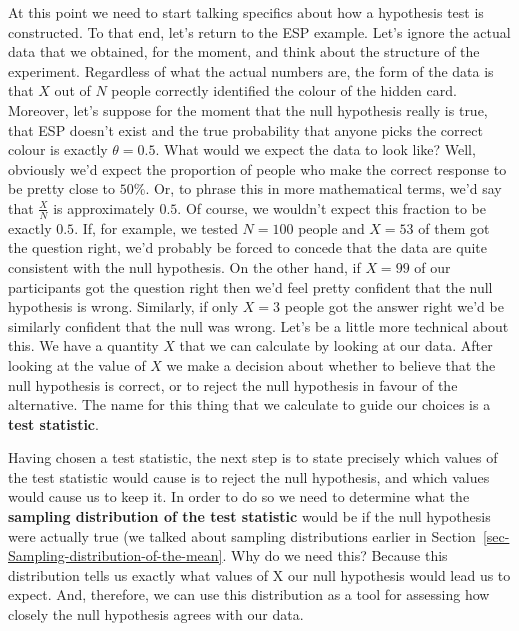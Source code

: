 \documentclass[
  a4paper,
]{book}
\begin{document}
At this point we need to start talking specifics about how a hypothesis
test is constructed. To that end, let's return to the ESP example. Let's
ignore the actual data that we obtained, for the moment, and think about
the structure of the experiment. Regardless of what the actual numbers
are, the form of the data is that \(X\) out of \(N\) people correctly
identified the colour of the hidden card. Moreover, let's suppose for
the moment that the null hypothesis really is true, that ESP doesn't
exist and the true probability that anyone picks the correct colour is
exactly \(\theta = 0.5\). What would we expect the data to look like?
Well, obviously we'd expect the proportion of people who make the
correct response to be pretty close to \(50\%\). Or, to phrase this in
more mathematical terms, we'd say that \(\frac{X}{N}\) is approximately
\(0.5\). Of course, we wouldn't expect this fraction to be exactly
\(0.5\). If, for example, we tested \(N = 100\) people and \(X = 53\) of
them got the question right, we'd probably be forced to concede that the
data are quite consistent with the null hypothesis. On the other hand,
if \(X = 99\) of our participants got the question right then we'd feel
pretty confident that the null hypothesis is wrong. Similarly, if only
\(X = 3\) people got the answer right we'd be similarly confident that
the null was wrong. Let's be a little more technical about this. We have
a quantity \(X\) that we can calculate by looking at our data. After
looking at the value of \(X\) we make a decision about whether to
believe that the null hypothesis is correct, or to reject the null
hypothesis in favour of the alternative. The name for this thing that we
calculate to guide our choices is a \textbf{test statistic}.

Having chosen a test statistic, the next step is to state precisely
which values of the test statistic would cause is to reject the null
hypothesis, and which values would cause us to keep it. In order to do
so we need to determine what the \textbf{sampling distribution of the
test statistic} would be if the null hypothesis were actually true (we
talked about sampling distributions earlier in
Section~\ref{sec-Sampling-distribution-of-the-mean}. Why do we need
this? Because this distribution tells us exactly what values of X our
null hypothesis would lead us to expect. And, therefore, we can use this
distribution as a tool for assessing how closely the null hypothesis
agrees with our data.
\end{document}
